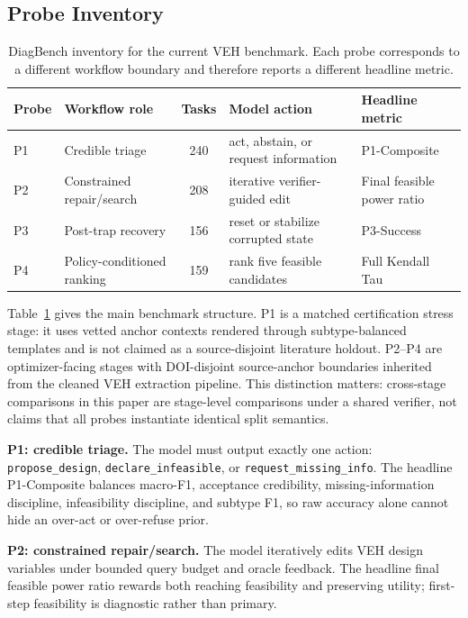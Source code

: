 \subsection{Probe Inventory}

\begin{table}[t]
\caption{DiagBench inventory for the current VEH benchmark. Each probe corresponds to a different workflow boundary and therefore reports a different headline metric.}
\label{tab:inventory}
\centering
\small
\setlength{\tabcolsep}{4pt}
\renewcommand{\arraystretch}{1.08}
\begin{tabular}{lp{30mm}cp{36mm}p{33mm}}
\toprule
Probe & Workflow role & Tasks & Model action & Headline metric \\
\midrule
P1 & Credible triage & 240 & act, abstain, or request information & P1-Composite \\
P2 & Constrained repair/search & 208 & iterative verifier-guided edit & Final feasible power ratio \\
P3 & Post-trap recovery & 156 & reset or stabilize corrupted state & P3-Success \\
P4 & Policy-conditioned ranking & 159 & rank five feasible candidates & Full Kendall Tau \\
\bottomrule
\end{tabular}
\end{table}

Table~\ref{tab:inventory} gives the main benchmark structure. P1 is a matched certification stress stage: it uses vetted anchor contexts rendered through subtype-balanced templates and is not claimed as a source-disjoint literature holdout. P2--P4 are optimizer-facing stages with DOI-disjoint source-anchor boundaries inherited from the cleaned VEH extraction pipeline. This distinction matters: cross-stage comparisons in this paper are stage-level comparisons under a shared verifier, not claims that all probes instantiate identical split semantics.

\textbf{P1: credible triage.} The model must output exactly one action: \texttt{propose\_design}, \texttt{declare\_infeasible}, or \texttt{request\_missing\_info}. The headline P1-Composite balances macro-F1, acceptance credibility, missing-information discipline, infeasibility discipline, and subtype F1, so raw accuracy alone cannot hide an over-act or over-refuse prior.

\textbf{P2: constrained repair/search.} The model iteratively edits VEH design variables under bounded query budget and oracle feedback. The headline final feasible power ratio rewards both reaching feasibility and preserving utility; first-step feasibility is diagnostic rather than primary.

